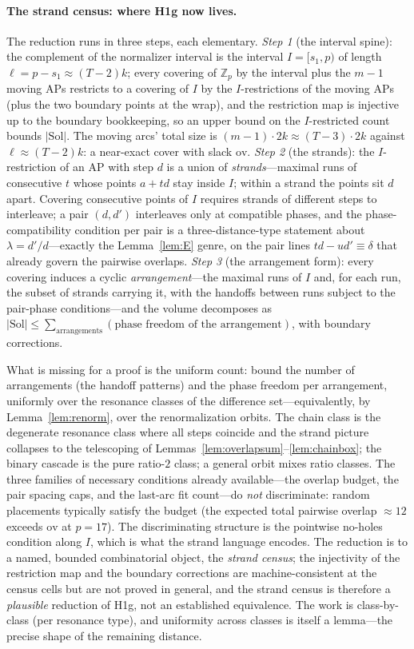 \documentclass[11pt,a4paper]{article}
\numberwithin{equation}{section}
\theoremstyle{plain}
\theoremstyle{definition}
\theoremstyle{remark}
\newcommand{\Z}{\mathbb{Z}}
\begin{document}
\paragraph{The strand census: where H1g now lives.}
The reduction runs in three steps, each elementary. \emph{Step 1}
(the interval spine): the complement of the normalizer interval is the
interval $I=[s_1,p)$ of length $\ell=p-s_1\approx(T-2)k$; every
covering of $\Z_p$ by the interval plus the $m-1$ moving APs restricts
to a covering of $I$ by the $I$-restrictions of the moving APs (plus
the two boundary points at the wrap), and the restriction map is
injective up to the boundary bookkeeping, so an upper bound on the
$I$-restricted count bounds $|\mathrm{Sol}|$. The moving arcs' total
size is $(m-1)\cdot2k\approx(T-3)\cdot2k$ against
$\ell\approx(T-2)k$: a near-exact cover with slack $\mathrm{ov}$.
\emph{Step 2} (the strands): the $I$-restriction of an AP with step
$d$ is a union of \emph{strands}---maximal runs of consecutive $t$
whose points $a+td$ stay inside $I$; within a strand the points sit $d$
apart. Covering consecutive points of $I$ requires strands of
different steps to interleave; a pair $(d,d')$ interleaves only at
compatible phases, and the phase-compatibility condition per pair is
a three-distance-type statement about $\lambda=d'/d$---exactly the
Lemma~\ref{lem:E} genre, on the pair lines $td-ud'\equiv\delta$ that
already govern the pairwise overlaps. \emph{Step 3} (the arrangement
form): every covering induces a cyclic \emph{arrangement}---the
maximal runs of $I$ and, for each run, the subset of strands carrying
it, with the handoffs between runs subject to the pair-phase
conditions---and the volume decomposes as
$|\mathrm{Sol}|\le\sum_{\text{arrangements}}(\text{phase freedom of
the arrangement})$, with boundary corrections.

What is missing for a proof is the uniform count: bound the number of
arrangements (the handoff patterns) and the phase freedom per
arrangement, uniformly over the resonance classes of the difference
set---equivalently, by Lemma~\ref{lem:renorm}, over the
renormalization orbits. The chain class is the degenerate resonance
class where all steps coincide and the strand picture collapses to the
telescoping of Lemmas~\ref{lem:overlapsum}--\ref{lem:chainbox}; the
binary cascade is the pure ratio-$2$ class; a general orbit mixes
ratio classes. The three families of necessary conditions already
available---the overlap budget, the pair spacing caps, and the
last-arc fit count---do \emph{not} discriminate: random placements
typically satisfy the budget (the expected total pairwise overlap
$\approx12$ exceeds $\mathrm{ov}$ at $p=17$). The discriminating
structure is the pointwise no-holes condition along $I$, which is what
the strand language encodes. The reduction is to a
named, bounded combinatorial object, the \emph{strand
census}; the injectivity of the restriction map and the boundary
corrections are machine-consistent at the census cells but are not
proved in general, and the strand census is therefore a
\emph{plausible} reduction of H1g, not an established equivalence. The
work is class-by-class (per resonance type), and uniformity across
classes is itself a lemma---the precise shape of the remaining distance.
\end{document}
